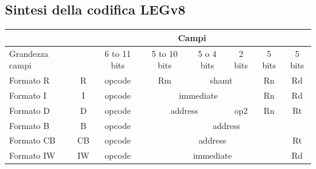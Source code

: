 \documentclass[12pt,a4paper]{article}
\begin{document}
\subsection{Sintesi della codifica LEGv8}
\Sep
\begin{center}
\begin{tabular}{|l|ccccccc|}
\hline
\rowcolor[HTML]{FFC702} 
\multicolumn{1}{|c|}{\cellcolor[HTML]{FFC702}Nome} & \multicolumn{7}{c|}{\cellcolor[HTML]{FFC702}Campi}                                                                                                                                                     \\ \hline
Grandezza campi                                    & \multicolumn{1}{c|}{}   & \multicolumn{1}{c|}{6 to 11 bits} & \multicolumn{1}{c|}{5 to 10 bits} & \multicolumn{1}{c|}{5 o 4 bits} & \multicolumn{1}{c|}{2 bits} & \multicolumn{1}{c|}{5 bits} & 5 bits \\ \hline
Formato R                                          & \multicolumn{1}{c|}{R}  & \multicolumn{1}{c|}{opcode}       & \multicolumn{1}{c|}{Rm}           & \multicolumn{2}{c|}{shamt}                                    & \multicolumn{1}{c|}{Rn}     & Rd     \\ \hline
Formato I                                          & \multicolumn{1}{c|}{I}  & \multicolumn{1}{c|}{opcode}       & \multicolumn{3}{c|}{immediate}                                                                    & \multicolumn{1}{c|}{Rn}     & Rd     \\ \hline
Formato D                                          & \multicolumn{1}{c|}{D}  & \multicolumn{1}{c|}{opcode}       & \multicolumn{2}{c|}{address}                                        & \multicolumn{1}{c|}{op2}    & \multicolumn{1}{c|}{Rn}     & Rt     \\ \hline
Formato B                                          & \multicolumn{1}{c|}{B}  & \multicolumn{1}{c|}{opcode}       & \multicolumn{5}{c|}{address}                                                                                                             \\ \hline
Formato CB                                         & \multicolumn{1}{c|}{CB} & \multicolumn{1}{c|}{opcode}       & \multicolumn{4}{c|}{address}                                                                                                    & Rt     \\ \hline
Formato IW                                         & \multicolumn{1}{c|}{IW} & \multicolumn{1}{c|}{opcode}       & \multicolumn{4}{c|}{immediate}                                                                                                  & Rd     \\ \hline
\end{tabular}
\end{center}
\end{document}
